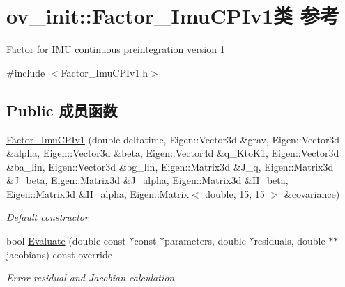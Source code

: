 \hypertarget{classov__init_1_1Factor__ImuCPIv1}{}\section{ov\+\_\+init\+:\+:Factor\+\_\+\+Imu\+C\+P\+Iv1类 参考}
\label{classov__init_1_1Factor__ImuCPIv1}


Factor for I\+MU continuous preintegration version 1  




{\ttfamily \#include $<$Factor\+\_\+\+Imu\+C\+P\+Iv1.\+h$>$}

\subsection*{Public 成员函数}
\begin{DoxyCompactItemize}
\item 
\mbox{\label{classov__init_1_1Factor__ImuCPIv1_af3bd5617ca4e6b1b27b71090e7434b61}} 
\hyperlink{classov__init_1_1Factor__ImuCPIv1_af3bd5617ca4e6b1b27b71090e7434b61}{Factor\+\_\+\+Imu\+C\+P\+Iv1} (double deltatime, Eigen\+::\+Vector3d \&grav, Eigen\+::\+Vector3d \&alpha, Eigen\+::\+Vector3d \&beta, Eigen\+::\+Vector4d \&q\+\_\+\+Kto\+K1, Eigen\+::\+Vector3d \&ba\+\_\+lin, Eigen\+::\+Vector3d \&bg\+\_\+lin, Eigen\+::\+Matrix3d \&J\+\_\+q, Eigen\+::\+Matrix3d \&J\+\_\+beta, Eigen\+::\+Matrix3d \&J\+\_\+alpha, Eigen\+::\+Matrix3d \&H\+\_\+beta, Eigen\+::\+Matrix3d \&H\+\_\+alpha, Eigen\+::\+Matrix$<$ double, 15, 15 $>$ \&covariance)
\begin{DoxyCompactList}\small\item\em Default constructor \end{DoxyCompactList}\item 
bool \hyperlink{classov__init_1_1Factor__ImuCPIv1_a76eebef0897757d9978af82b0f256f28}{Evaluate} (double const $\ast$const $\ast$parameters, double $\ast$residuals, double $\ast$$\ast$jacobians) const override
\begin{DoxyCompactList}\small\item\em Error residual and Jacobian calculation \end{DoxyCompactList}\end{DoxyCompactItemize}
